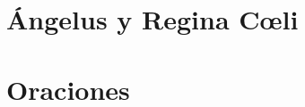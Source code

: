 \documentclass[10pt,oneside]{book}
\begin{document}
\chapter*{Ángelus y Regina C{\oe}li}

\section*{}

\begin{paracol}{2}  
      
      
      \switchcolumn
      
                                                                        
\end{paracol}

\section*{}

\begin{paracol}{2}  
      
      
      \switchcolumn
      
                                                                      
\end{paracol}
\chapter*{Oraciones}
\end{document}
